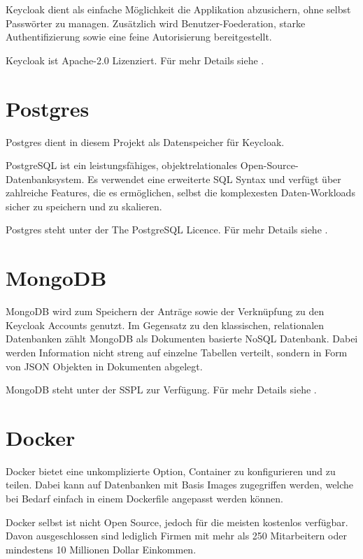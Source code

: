 Keycloak dient als einfache Möglichkeit die Applikation abzusichern, ohne selbst Passwörter zu managen.
Zusätzlich wird \gls{Benutzer-Foederation}, starke Authentifizierung sowie eine feine Autorisierung bereitgestellt.
\cite{about-keycloak}

Keycloak ist Apache-2.0 Lizenziert.
Für mehr Details siehe .

\section{Postgres}\label{sec:postgres}

Postgres dient in diesem Projekt als Datenspeicher für Keycloak.

PostgreSQL ist ein leistungsfähiges, objektrelationales Open-Source-Datenbanksystem.
Es verwendet eine erweiterte \ac{SQL} Syntax und verfügt über zahlreiche Features,
die es ermöglichen, selbst die komplexesten Daten-Workloads sicher zu speichern und zu skalieren.
\cite{about-postgres}

Postgres steht unter der The PostgreSQL Licence.
Für mehr Details siehe .


\section{MongoDB}\label{sec:mongodb}

MongoDB wird zum Speichern der Anträge sowie der Verknüpfung zu den Keycloak Accounts genutzt.
Im Gegensatz zu den klassischen, relationalen Datenbanken zählt MongoDB als Dokumenten basierte NoSQL Datenbank.
Dabei werden Information nicht streng auf einzelne Tabellen verteilt, sondern in Form von \ac{JSON} Objekten in Dokumenten abgelegt.

MongoDB steht unter der \acl{SSPL} zur Verfügung.
Für mehr Details siehe .

\section{Docker}\label{sec:docker}

Docker bietet eine unkomplizierte Option, Container zu konfigurieren und zu teilen.
Dabei kann auf Datenbanken mit Basis Images zugegriffen werden, welche bei Bedarf
einfach in einem Dockerfile angepasst werden können.

Docker selbst ist nicht Open Source, jedoch für die meisten kostenlos verfügbar.
Davon ausgeschlossen sind lediglich Firmen mit mehr als 250 Mitarbeitern oder mindestens 10 Millionen Dollar Einkommen.


